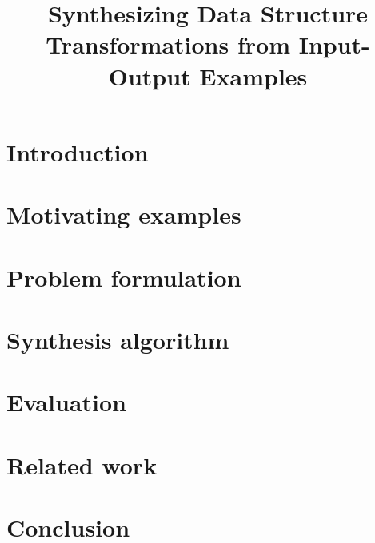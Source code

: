 \documentclass[pldi,nocopyrightspace]{sigplanconf}
\theoremstyle{definition}
\begin{document}

  



\authorinfo{}{}{}

 
\title{Synthesizing Data Structure Transformations from Input-Output Examples \\
\vspace{-0.8in}}
 
\maketitle  

\begin{abstract}

\end{abstract}

\newcommand{\seclabel}[1]{\label{sec:#1}}
\newcommand{\secref}[1]{Sec.~\ref{sec:#1}}
\newcommand{\figlabel}[1]{\label{fig:#1}}
\newcommand{\figref}[1]{Figure~\ref{fig:#1}}

\newcommand{\fix}{\mathbf{fix}}
\newcommand{\E}{\mathcal{E}}



\section{Introduction}\seclabel{intro}



\section{Motivating examples}\seclabel{example}



\section{Problem formulation}\seclabel{problem}



\section{Synthesis algorithm}\seclabel{algo}



\section{Evaluation}\seclabel{eval}



\section{Related work}\seclabel{relwork}



\section{Conclusion}\seclabel{conc}



\newpage


 
\end{document}
